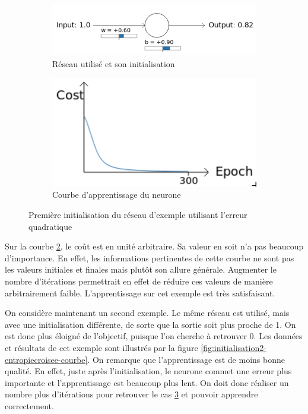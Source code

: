 \begin{figure}[h]
\centering
\begin{subfigure}{.5\textwidth}
  \centering
  \includegraphics[width=.6\linewidth]{img/entropiecroisee_reseau_utilise.png}
  \caption{Réseau utilisé et son initialisation}
  \label{fig:initialisation1-entropiecroisee-schema}
\end{subfigure}%
\begin{subfigure}{.4\textwidth}
  \centering
  \includegraphics[width=.4\linewidth]{img/entropiecroisee_apprentissage1.png}
  \caption{Courbe d'apprentissage du neurone}
  \label{fig:initialisation1-entropiecroisee-courbe}
\end{subfigure}
\caption{Première initialisation du réseau d'exemple utilisant l'erreur quadratique}
\label{fig:initialisation1-entropiecroisee}
\end{figure}


Sur la courbe \ref{fig:initialisation1-entropiecroisee-courbe}, le coût est en unité arbitraire. Sa valeur en soit n'a pas beaucoup d'importance. En effet, les informations pertinentes de cette courbe ne sont pas les valeurs initiales et finales mais plutôt son allure générale. Augmenter le nombre d'itérations permettrait en effet de réduire ces valeurs de manière arbitrairement faible. L'apprentissage sur cet exemple est très satisfaisant.

On considère maintenant un second exemple. Le même réseau est utilisé, mais avec une initialisation différente, de sorte que la sortie soit plus proche de 1. On est donc plus éloigné de l'objectif, puisque l'on cherche à retrouver 0.
Les données et résultats de cet exemple sont illustrés par la figure \ref{fig:initialisation2-entropiecroisee-courbe}.
On remarque que l'apprentissage est de moins bonne qualité. En effet, juste après l'initialisation, le neurone commet une erreur plus importante et l'apprentissage est beaucoup plus lent. On doit donc réaliser un nombre plus d'itérations pour retrouver le cas \ref{fig:initialisation1-entropiecroisee} et pouvoir apprendre correctement.

